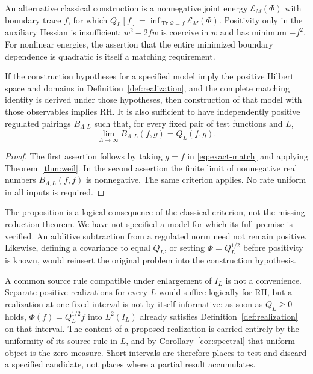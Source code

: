 An alternative classical construction is a nonnegative joint energy
$\mathcal E_M(\Phi)$ with boundary trace $f$, for which
$Q_L[f]=\inf_{\operatorname{Tr}\Phi=f}\mathcal E_M(\Phi)$.
Positivity only in the auxiliary Hessian is insufficient:
$w^2-2fw$ is coercive in $w$ and has minimum $-f^2$.
For nonlinear energies, the assertion that the entire minimized
boundary dependence is quadratic is itself a matching requirement.

\begin{proposition}
\label{prop:conditional}
If the construction hypotheses for a specified model imply the positive
Hilbert space and domains in Definition~\ref{def:realization}, and the
complete matching identity is derived under those hypotheses, then
construction of that model with those observables implies RH.
It is also sufficient to have independently positive regulated pairings
$B_{\Lambda,L}$ such that, for every fixed pair of test functions and $L$,
\begin{equation}\label{eq:regulated-limit}
 \lim_{\Lambda\to\infty}B_{\Lambda,L}(f,g)=Q_L(f,g).
\end{equation}
\end{proposition}
\begin{proof}
The first assertion follows by taking $g=f$ in \eqref{eq:exact-match}
and applying Theorem~\ref{thm:weil}. In the second assertion the finite
limit of nonnegative real numbers $B_{\Lambda,L}(f,f)$ is nonnegative.
The same criterion applies. No rate uniform in all inputs is required.
\end{proof}

The proposition is a logical consequence of the classical criterion,
not the missing reduction theorem. We have not specified a model for
which its full premise is verified. An additive subtraction from a
regulated norm need not remain positive. Likewise, defining a covariance
to equal $Q_L$, or setting $\Phi=Q_L^{1/2}$ before positivity is known,
would reinsert the original problem into the construction hypothesis.

A common source rule compatible under enlargement of $I_L$ is not a
convenience. Separate positive realizations for every $L$ would suffice
logically for RH, but a realization at one fixed interval is not by itself
informative: as soon as $Q_L\geq0$ holds, $\Phi(f)=Q_L^{1/2}f$ into
$L^2(I_L)$ already satisfies Definition~\ref{def:realization} on that
interval. The content of a proposed realization is carried entirely by the
uniformity of its source rule in $L$, and by
Corollary~\ref{cor:spectral} that uniform object is the zero measure.
Short intervals are therefore places to test and discard a specified
candidate, not places where a partial result accumulates.


